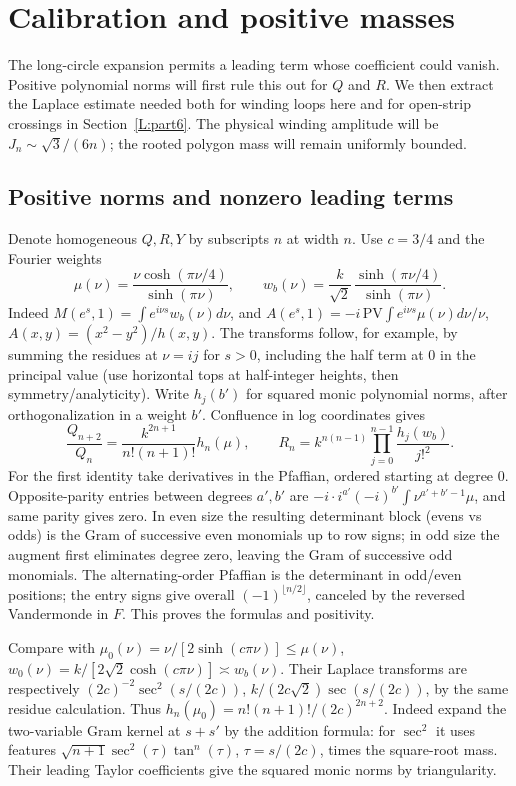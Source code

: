 \section{Calibration and positive masses}\label{L:part4}

The long-circle expansion permits a leading term whose coefficient could
vanish. Positive polynomial norms will first rule this out for $Q$ and $R$.
We then extract the Laplace estimate needed both for winding loops here
and for open-strip crossings in Section~\ref{L:part6}. The physical
winding amplitude will be $J_n\sim\sqrt3/(6n)$; the rooted polygon
mass will remain uniformly bounded.

\subsection{Positive norms and nonzero leading terms}
Denote homogeneous \(Q,R,Y\) by subscripts \(n\) at width \(n\). Use \(c=3/4\) and the Fourier weights
\[
 \mu(\nu)=\frac{\nu\cosh(\pi\nu/4)}{\sinh(\pi\nu)},\qquad
 w_b(\nu)=\frac{k}{\sqrt2}\,\frac{\sinh(\pi\nu/4)}{\sinh(\pi\nu)} .
\]
Indeed \(M(e^s,1)=\int e^{i\nu s}w_b(\nu)d\nu\), and \(A(e^s,1)= -i\,\mathrm{PV}\int e^{i\nu s}\mu(\nu)d\nu/\nu\), \(A(x,y)=(x^2-y^2)/h(x,y)\). The transforms follow, for example, by summing the residues at \(\nu=i j\) for \(s>0\), including the half term at 0 in the principal value (use horizontal tops at half-integer heights, then symmetry/analyticity). Write \(h_j(b')\) for squared monic polynomial norms, after orthogonalization in a weight \(b'\). Confluence in log coordinates gives
\[
 \frac{Q_{n+2}}{Q_n}=\frac{k^{2n+1}}{n!(n+1)!} h_n(\mu),\qquad
 R_n=k^{n(n-1)}\prod_{j=0}^{n-1}\frac{h_j(w_b)}{j!^2}.
\]
For the first identity take derivatives in the Pfaffian, ordered starting at degree 0. Opposite-parity entries between degrees \(a',b'\) are \(-i\cdot i^{a'}(-i)^{b'}\int\nu^{a'+b'-1}\mu\), and same parity gives zero. In even size the resulting determinant block (evens vs odds) is the Gram of successive even monomials up to row signs; in odd size the augment first eliminates degree zero, leaving the Gram of successive odd monomials. The alternating-order Pfaffian is the determinant in odd/even positions; the entry signs give overall \((-1)^{\lfloor n/2\rfloor}\), canceled by the reversed Vandermonde in \(F\). This proves the formulas and positivity.

Compare with
\(\mu_0(\nu)=\nu/[2\sinh(c\pi\nu)]\le\mu(\nu)\),
\(w_0(\nu)=k/[2\sqrt2\cosh(c\pi\nu)]\asymp w_b(\nu)\). Their Laplace transforms are respectively \((2c)^{-2}\sec^2(s/(2c))\), \(k/(2c\sqrt2)\sec(s/(2c))\), by the same residue calculation. Thus
\(h_n(\mu_0)=n!(n+1)!/(2c)^{2n+2}\). Indeed expand the two-variable Gram kernel at \(s+s'\) by the addition formula: for \(\sec^2\) it uses features \(\sqrt{n+1}\sec^2(\tau)\tan^n(\tau)\), \(\tau=s/(2c)\), times the square-root mass. Their leading Taylor coefficients give the squared monic norms by triangularity.

